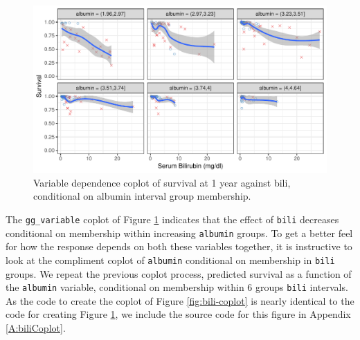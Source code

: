 \documentclass[article, nojss]{jss}
\begin{document}
\begin{Schunk}
\begin{figure}[!htb]

{\centering \includegraphics{rfs-albumin-coplot-1}

}

\caption[Variable dependence coplot of survival at 1 year against bili, conditional on albumin interval group membership]{Variable dependence coplot of survival at 1 year against bili, conditional on albumin interval group membership.}\label{fig:albumin-coplot}
\end{figure}
\end{Schunk}

The \texttt{gg\_variable} coplot of Figure \ref{fig:albumin-coplot}
indicates that the effect of \texttt{bili} decreases conditional on
membership within increasing \texttt{albumin} groups. To get a better
feel for how the response depends on both these variables together, it
is instructive to look at the compliment coplot of \texttt{albumin}
conditional on membership in \texttt{bili} groups. We repeat the
previous coplot process, predicted survival as a function of the
\texttt{albumin} variable, conditional on membership within 6 groups
\texttt{bili} intervals. As the code to create the coplot of Figure
\ref{fig:bili-coplot} is nearly identical to the code for creating
Figure \ref{fig:albumin-coplot}, we include the source code for this
figure in Appendix \ref{A:biliCoplot}.
\end{document}
